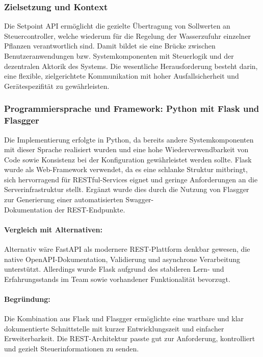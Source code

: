 \subsubsection*{Zielsetzung und Kontext}

Die Setpoint API erm\"oglicht die gezielte \"Ubertragung von Sollwerten an Steuercontroller, welche wiederum f\"ur die Regelung der Wasserzufuhr einzelner Pflanzen verantwortlich sind. Damit bildet sie eine Br\"ucke zwischen Benutzeranwendungen bzw. Systemkomponenten mit Steuerlogik und der dezentralen Aktorik des Systems. Die wesentliche Herausforderung besteht darin, eine flexible, zielgerichtete Kommunikation mit hoher Ausfallsicherheit und Ger\"atespezifit\"at zu gew\"ahrleisten.

\subsubsection*{Programmiersprache und Framework: Python mit Flask und Flasgger}

Die Implementierung erfolgte in Python, da bereits andere Systemkomponenten mit dieser Sprache realisiert wurden und eine hohe Wiederverwendbarkeit von Code sowie Konsistenz bei der Konfiguration gew\"ahrleistet werden sollte. Flask wurde als Web-Framework verwendet, da es eine schlanke Struktur mitbringt, sich hervorragend f\"ur RESTful-Services eignet und geringe Anforderungen an die Serverinfrastruktur stellt. Erg\"anzt wurde dies durch die Nutzung von Flasgger zur Generierung einer automatisierten Swagger-\\Dokumentation der REST-Endpunkte.\cite{flasgger_docs}

\paragraph*{Vergleich mit Alternativen:}

Alternativ w\"are FastAPI als modernere REST-Plattform denkbar gewesen, die native OpenAPI-Dokumentation, Validierung und asynchrone Verarbeitung unterst\"utzt. Allerdings wurde Flask aufgrund des stabileren Lern- und Erfahrungsstands im Team sowie vorhandener Funktionalit\"at bevorzugt.

\paragraph*{Begr\"undung:}

Die Kombination aus Flask und Flasgger erm\"oglichte eine wartbare und klar dokumentierte Schnittstelle mit kurzer Entwicklungszeit und einfacher Erweiterbarkeit. Die REST-Architektur passte gut zur Anforderung, kontrolliert und gezielt Steuerinformationen zu senden.


